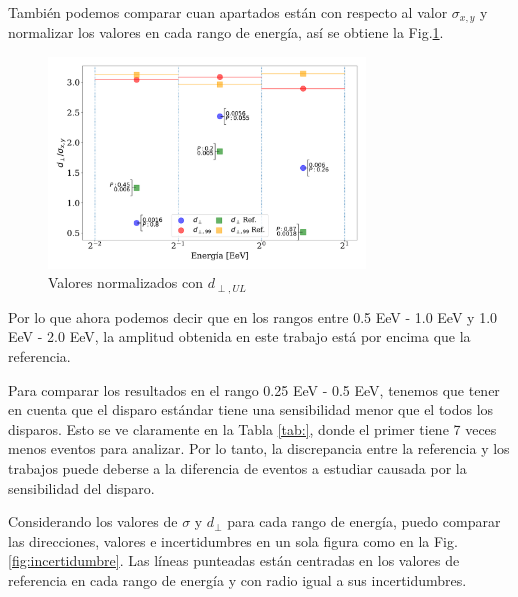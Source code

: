     También podemos comparar cuan apartados están con respecto al valor $\sigma_{x,y}$ y normalizar los valores en cada rango de energía, así se obtiene la Fig.\ref{fig:normalizado_sigma}.

    \begin{figure}[H]
        \begin{small}
            \begin{center}
                \includegraphics[width=0.75\textwidth]{d_perp_normalizado_sigmas_v5.pdf}
            \end{center}
            \caption{Valores normalizados con $d_{\perp,UL}$}
            \label{fig:normalizado_sigma}
        \end{small}
    \end{figure}

Por lo que ahora podemos decir que en los rangos entre 0.5 EeV - 1.0 EeV y 1.0 EeV - 2.0 EeV, la amplitud obtenida en este trabajo está por encima que la referencia. 

Para comparar los resultados en el  rango 0.25 EeV - 0.5 EeV, tenemos que tener en cuenta que el disparo estándar tiene una sensibilidad menor que el todos los disparos. Esto se ve claramente en la Tabla \ref{tab:}, donde el primer tiene 7 veces menos eventos para analizar. Por lo tanto, la discrepancia entre la referencia y los trabajos puede deberse a la  diferencia de eventos a estudiar causada por la sensibilidad del disparo.


Considerando los valores de $\sigma$ y $d_\perp$ para cada rango de energía, puedo comparar las direcciones, valores e incertidumbres en un sola figura como en la Fig.\ref{fig:incertidumbre}. Las líneas punteadas están centradas en los valores de referencia en cada rango de energía y con radio igual a sus incertidumbres. 

